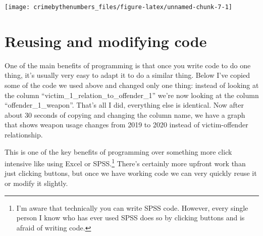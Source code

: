 \documentclass[
]{krantz}
\makeatletter
\newenvironment{Shaded}{\begin{snugshade}}{\end{snugshade}}
\newcommand{\AttributeTok}[1]{\textcolor[rgb]{0.61,0.61,0.61}{#1}}
\newcommand{\FunctionTok}[1]{\textcolor[rgb]{0,0,0}{#1}}
\newcommand{\NormalTok}[1]{#1}
\newcommand{\OtherTok}[1]{\textcolor[rgb]{0.37,0.37,0.37}{#1}}
\newcommand{\SpecialCharTok}[1]{\textcolor[rgb]{0,0,0}{#1}}
\newcommand{\StringTok}[1]{\textcolor[rgb]{0.5,0.5,0.5}{#1}}
\newenvironment{kframe}{%
\medskip{}
\setlength{\fboxsep}{.8em}
 \def\at@end@of@kframe{}%
 \ifinner\ifhmode%
  \def\at@end@of@kframe{\end{minipage}}%
  \begin{minipage}{\columnwidth}%
 \fi\fi%
 \def\FrameCommand##1{\hskip\@totalleftmargin \hskip-\fboxsep
 \colorbox{shadecolor}{##1}\hskip-\fboxsep
     \hskip-\linewidth \hskip-\@totalleftmargin \hskip\columnwidth}%
 \MakeFramed {\advance\hsize-\width
   \@totalleftmargin\z@ \linewidth\hsize
   \@setminipage}}%
 {\par\unskip\endMakeFramed%
 \at@end@of@kframe}
\renewenvironment{Shaded}{\begin{kframe}}{\end{kframe}}
\makeatother
\begin{document}
\begin{Shaded}
\end{Shaded}

\begin{center}\texttt{[image: crimebythenumbers\_files/figure-latex/unnamed-chunk-7-1]} \end{center}

\hypertarget{reusing-and-modifying-code}{%
\section{Reusing and modifying code}\label{reusing-and-modifying-code}}

One of the main benefits of programming is that once you write code to do one thing, it's usually very easy to adapt it to do a similar thing. Below I've copied some of the code we used above and changed only one thing: instead of looking at the column ``victim\_1\_relation\_to\_offender\_1'' we're now looking at the column ``offender\_1\_weapon''. That's all I did, everything else is identical. Now after about 30 seconds of copying and changing the column name, we have a graph that shows weapon usage changes from 2019 to 2020 instead of victim-offender relationship.

This is one of the key benefits of programming over something more click intensive like using Excel or SPSS.\footnote{I'm aware that technically you can write SPSS code. However, every single person I know who has ever used SPSS does so by clicking buttons and is afraid of writing code.} There's certainly more upfront work than just clicking buttons, but once we have working code we can very quickly reuse it or modify it slightly.
\end{document}
